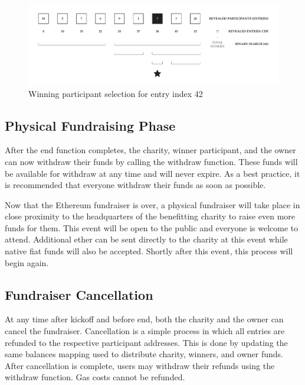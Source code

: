\documentclass[11pt]{article}
\begin{document}
\begin{figure}[H]
\begin{center}
\includegraphics[width=1.0\textwidth]{winningParticipantSelection.pdf}
\caption{Winning participant selection for entry index 42}
\label{figure:winningParticipantSelection}
\end{center}
\end{figure}

\subsection{Physical Fundraising Phase}

After the end function completes, the charity, winner participant, and the owner can now withdraw their funds by calling the withdraw function. These funds will be available for withdraw at any time and will never expire. As a best practice, it is recommended that everyone withdraw their funds as soon as possible.

Now that the Ethereum fundraiser is over, a physical fundraiser will take place in close proximity to the headquarters of the benefitting charity to raise even more funds for them. This event will be open to the public and everyone is welcome to attend. Additional ether can be sent directly to the charity at this event while native fiat funds will also be accepted. Shortly after this event, this process will begin again.

\subsection{Fundraiser Cancellation}

At any time after kickoff and before end, both the charity and the owner can cancel the fundraiser. Cancellation is a simple process in which all entries are refunded to the respective participant addresses. This is done by updating the same balances mapping used to distribute charity, winners, and owner funds. After cancellation is complete, users may withdraw their refunds using the withdraw function. Gas costs cannot be refunded.
\end{document}

